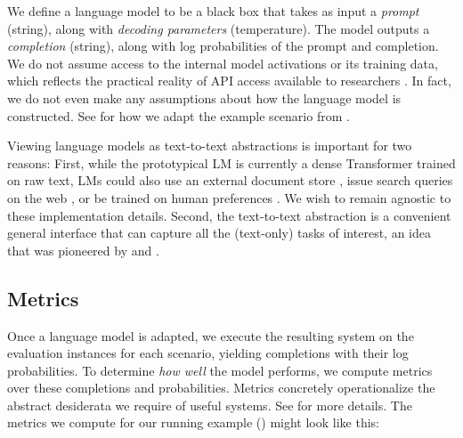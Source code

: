 We define a language model to be a black box that takes as input a \emph{prompt} (string), along with \emph{decoding parameters} (\eg temperature).
The model outputs a \emph{completion} (string), along with log probabilities of the prompt and completion.
We do not assume access to the internal model activations or its training data, which reflects the practical reality of API access available to researchers \citep{liang2022community-norms}.
In fact, we do not even make any assumptions about how the language model is constructed.
See  for how we adapt the example scenario from .

Viewing language models as text-to-text abstractions is important for two reasons:
First, while the prototypical LM is currently a dense Transformer trained on raw text, LMs could also use an external document store \citep{lewis2020rag}, issue search queries on the web \citep{nakano2021webgpt}, or be trained on human preferences \citep{ouyang2022instructions,bai2022helpful}.
We wish to remain agnostic to these implementation details. 
Second, the text-to-text abstraction is a convenient general interface that can capture all the (text-only) tasks of interest, an idea that was pioneered by \citet{mccann2018natural} and \citet{raffel2019exploring}.


\hypertarget{preliminaries-metrics}{\subsection{Metrics}}
\label{sec:preliminaries-metrics}

Once a language model is adapted, we execute the resulting system on the evaluation instances for each scenario, yielding completions with their log probabilities.  
To determine \textit{how well} the model performs, we compute metrics over these completions and probabilities.
Metrics concretely operationalize the abstract desiderata we require of useful systems.
See  for more details.
The metrics we compute for our running example () might look like this:

